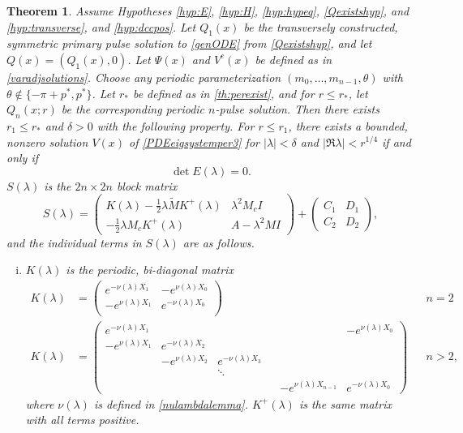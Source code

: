 \documentclass[12pt]{elsarticle}
\theoremstyle{plain}
\newtheorem{theorem}{Theorem}
\theoremstyle{definition}
\theoremstyle{remark}
\numberwithin{theorem}{section}
\numberwithin{equation}{section}
\begin{document}
\begin{theorem}\label{blockmatrixtheorem}
Assume Hypotheses \ref{hyp:E}, \ref{hyp:H}, \ref{hyp:hypeq}, \ref{Qexistshyp}, and \ref{hyp:transverse}, and \ref{hyp:dccpos}. Let $Q_1(x)$ be the transversely constructed, symmetric primary pulse solution to \cref{genODE} from \cref{Qexistshyp}, and let $Q(x) = (Q_1(x), 0)$. Let $\Psi(x)$ and $V^c(x)$ be defined as in \cref{varadjsolutions}. Choose any periodic parameterization $(m_0, \dots, m_{n-1}, \theta)$ with $\theta \notin \{-\pi + p^*, p^* \}$. Let $r_*$ be defined as in \cref{th:perexist}, and for $r \leq r_*$, let $Q_n(x; r)$ be the corresponding periodic $n$-pulse solution. Then there exists $r_1 \leq r_*$ and $\delta > 0$ with the following property. For $r \leq r_1$, there exists a bounded, nonzero solution $V(x)$ of \cref{PDEeigsystemper3} for $|\lambda| < \delta$ and $|\Re \lambda| < r^{1/4}$ if and only if
\begin{equation}\label{blockmatrixcond}
\det E(\lambda) = 0.
\end{equation}
$S(\lambda)$ is the $2n \times 2n$ block matrix
\begin{equation}\label{blockeq}
S(\lambda) = 
\begin{pmatrix}
K(\lambda) - \frac{1}{2} \lambda \tilde{M} K^+(\lambda) & \lambda^2 M_c I \\
-\frac{1}{2} \lambda M_c K^+(\lambda) & A - \lambda^2 MI 
\end{pmatrix} +
\begin{pmatrix}C_1 & D_1 \\ C_2 & D_2
\end{pmatrix},
\end{equation}
and the individual terms in $S(\lambda)$ are as follows.

\begin{enumerate}[(i)]
\item $K(\lambda)$ is the periodic, bi-diagonal matrix
\begin{align*}
K(\lambda) &=  
\begin{pmatrix}
e^{-\nu(\lambda)X_1} & -e^{\nu(\lambda)X_0} \\
-e^{\nu(\lambda)X_1} & e^{-\nu(\lambda)X_0} \\
\end{pmatrix} && n = 2\\
K(\lambda) &=  
\begin{pmatrix}
e^{-\nu(\lambda)X_1} & & & & & -e^{\nu(\lambda)X_0} \\
-e^{\nu(\lambda)X_1} & e^{-\nu(\lambda)X_2} \\
& -e^{\nu(\lambda)X_2} & e^{-\nu(\lambda)X_3} \\
  & & \ddots & && \\
& & & & -e^{\nu(\lambda)X_{n-1}} & e^{-\nu(\lambda)X_0}
\end{pmatrix} && n > 2,
\end{align*}
where $\nu(\lambda)$ is defined in \cref{nulambdalemma}. $K^+(\lambda)$ is the same matrix with all terms positive.


\end{enumerate}
\end{theorem}
\end{document}
